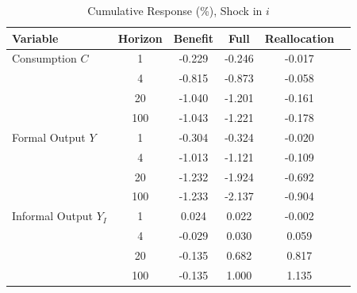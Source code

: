 \begin{table}[htbp]
\centering
\caption{Cumulative Response (\%), Shock in $i$}
\label{tab:monetary_cumulative}
\small
\begin{tabular}{lccccc}
\toprule
Variable & Horizon & Benefit & Full & Reallocation \\
\midrule
 Consumption $C$ & 1 & -0.229 & -0.246 & -0.017 \\
  & 4 & -0.815 & -0.873 & -0.058 \\
  & 20 & -1.040 & -1.201 & -0.161 \\
  & 100 & -1.043 & -1.221 & -0.178 \\
\midrule
 Formal Output $Y$ & 1 & -0.304 & -0.324 & -0.020 \\
  & 4 & -1.013 & -1.121 & -0.109 \\
  & 20 & -1.232 & -1.924 & -0.692 \\
  & 100 & -1.233 & -2.137 & -0.904 \\
\midrule
 Informal Output $Y_I$ & 1 & 0.024 & 0.022 & -0.002 \\
  & 4 & -0.029 & 0.030 & 0.059 \\
  & 20 & -0.135 & 0.682 & 0.817 \\
  & 100 & -0.135 & 1.000 & 1.135 \\
\bottomrule
\end{tabular}
\end{table}
